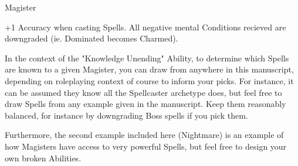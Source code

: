 \begin{monsterboxbg}{Magister}

    \begin{rpg-monsteraction}
        +1 Accuracy when casting Spells. All negative mental Conditions recieved are downgraded (ie. Dominated becomes Charmed).
    \end{rpg-monsteraction}

    

    In the context of the "Knowledge Unending" Ability, to determine which Spells are known to a given Magister, you can draw from anywhere in this manuscript, depending on roleplaying context of course to inform your picks. For instance, it can be assumed they know all the Spellcaster archetype does, but feel free to draw Spells from any example given in the manuscript. Keep them reasonably balanced, for instance by downgrading Boss spells if you pick them.
    
    Furthermore, the second example included here (Nightmare) is an example of how Magisters have access to very powerful Spells, but feel free to design your own broken Abilities.

\end{monsterboxbg}









